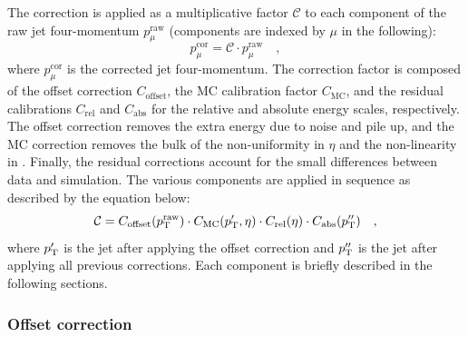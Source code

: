The correction is applied as a multiplicative factor $\mathcal{C}$ to each component of the raw jet four-momentum $p_\mu^\mathrm{raw}$ (components are indexed by $\mu$ in the following):
\begin{equation}
p_\mu^\mathrm{cor} = \mathcal{C}\cdot p_\mu^\mathrm{raw} \quad,
\end{equation}
where $p_\mu^\mathrm{cor}$ is the corrected jet four-momentum. The correction factor is composed of the offset correction $C_\mathrm{offset}$, the MC calibration factor $C_\mathrm{MC}$, and the residual calibrations $C_\mathrm{rel}$ and $C_\mathrm{abs}$ for the relative and absolute energy scales, respectively. The offset correction removes the extra energy due to noise and pile up, and the MC correction removes the bulk of the non-uniformity in $\eta$ and the non-linearity in \pt. Finally, the residual corrections account for the small differences between data and simulation. The various components are applied in sequence as described by the equation below:
\begin{equation}
\mathcal{C} = C_\mathrm{offset}(p_\mathrm{T}^\mathrm{raw}) \cdot C_\mathrm{MC}(p_\mathrm{T}',\eta) \cdot C_\mathrm{rel}(\eta) \cdot C_\mathrm{abs}(p_\mathrm{T}'') \quad ,
\end{equation}
where $p_\mathrm{T}'$ is the jet \pt after applying the offset correction and $p_\mathrm{T}''$ is the jet \pt after applying all previous corrections. Each component is briefly described in the following sections.

\subsubsection{Offset correction}
 
